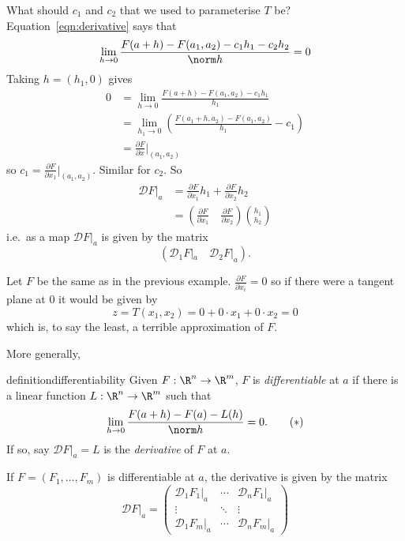 \documentclass[a4paper]{article}
\newcommand*{\D}{\mathcal{D}}
\theoremstyle{definition}
\begin{document}
What should \(c_1\) and \(c_2\) that we used to parameterise \(T\) be? Equation~\eqref{eqn:derivative} says that
\[
  \lim_{h \to 0} \frac{F(a + h) - F(a_1, a_2) - c_1h_1 - c_2h_2}{\norm h} = 0
\]
Taking \(h = (h_1, 0)\) gives
\begin{align*}
  0 &= \lim_{h \to 0} \frac{F(a + h) - F(a_1, a_2) - c_1h_1}{h_1} \\
    &= \lim_{h_1 \to 0} \left( \frac{F(a_1 + h, a_2) - F(a_1, a_2)}{h_1} - c_1 \right) \\
    &= \frac{\partial F}{\partial x} \Big|_{(a_1, a_2)}
\end{align*}
so \(c_1 = \frac{\partial F}{\partial x_1}|_{(a_1, a_2)}\). Similar for \(c_2\). So
\begin{align*}
    \D F|_a &= \frac{\partial F}{\partial x_1} h_1 + \frac{\partial F}{\partial x_2} h_2 \\
            &= \left( \frac{\partial F}{\partial x_1} \quad \frac{\partial F}{\partial x_2} \right) \binom{h_1}{h_2}
\end{align*}
i.e.\ as a map \(\D F|_a\) is given by the matrix
\[
  (\D_1 F|_a \quad \D_2 F|_a ).
\]

\begin{eg}
  Let \(F\) be the same as in the previous example. \(\frac{\partial F}{\partial x_i} = 0\) so if there were a tangent plane at 0 it would be given by
  \[
    z = T(x_1, x_2) = 0 + 0 \cdot x_1 + 0 \cdot x_2 = 0
  \]
  which is, to say the least, a terrible approximation of \(F\).
\end{eg}

More generally,

\begin{restatable}[Differentiability]{definition}{differentiability}
  Given \(F: \R^n \to \R^m\), \(F\) is \emph{differentiable} at \(a\) if there is a linear function \(L: \R^n \to \R^m\) such that
  \begin{equation*}
    \label{eqn:derivative2}
    \lim_{h \to 0} \frac{F(a + h) - F(a) - L(h)}{\norm h} = 0.
    \tag{\(\ast\)}
  \end{equation*}
  If so, say \(\D F|_a = L\) is the \emph{derivative} of \(F\) at \(a\).
\end{restatable}

If \(F = (F_1, \dots, F_m)\) is differentiable at \(a\), the derivative is given by the matrix
\[
  \D F|_a =
  \begin{pmatrix}
    \D_1F_1|_a & \cdots & \D_nF_1|_a \\
    \vdots & \ddots & \vdots \\
    \D_1F_m|_a & \cdots & \D_nF_m|_a
  \end{pmatrix}
\]
  
\end{document}
